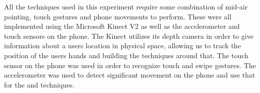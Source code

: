 All the techniques used in this experiment require some combination of mid-air pointing, touch gestures and phone movements to perform. 
These were all implemented using the Microsoft Kinect V2 as well as the accelerometer and touch sensors on the phone. 
The Kinect utilizes its depth camera in order to give information about a users location in physical space, allowing us to track the position of the users hands and building the techniques around that. 
The touch sensor on the phone was used in order to recognize touch and swipe gestures.
The accelerometer was used to detect significant movement on the phone and use that for the \tilt and \throw techniques. 